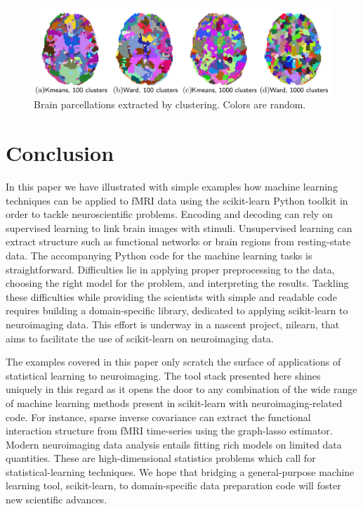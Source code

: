 \documentclass{frontiersSCNS} %
\begin{document}
\begin{figure}[hbtp]
  \includegraphics[width=\linewidth]{clustering}
  \caption{Brain parcellations extracted by clustering. Colors are
random.}
  \label{fig:clustering}
\end{figure}

\section{Conclusion}

In this paper we have illustrated with simple examples how machine
learning techniques can be applied
to fMRI data using the scikit-learn Python toolkit in order to tackle
neuroscientific problems. Encoding and decoding can rely on supervised
learning to link brain images with stimuli. Unsupervised learning
can extract structure such as functional networks or
brain regions from resting-state data. The accompanying Python code for the machine learning
tasks is straightforward. Difficulties lie in applying proper 
preprocessing to the data, choosing the right model for the problem,
and interpreting the results. Tackling these difficulties while
providing the scientists with simple and readable code requires building
a domain-specific library, dedicated to applying scikit-learn to
neuroimaging data. This effort is underway in a nascent project, nilearn,
that aims to facilitate the use of scikit-learn on neuroimaging data.

The examples covered in this paper only scratch the
surface of applications of statistical learning to neuroimaging.
The tool stack presented here shines uniquely in this regard as it opens the
door to any combination of the wide range of machine learning methods
present in scikit-learn with neuroimaging-related code. For
instance, sparse inverse covariance can extract the functional 
interaction structure from fMRI time-series \citep{varoquaux2013} using
the graph-lasso estimator.
Modern neuroimaging data analysis entails fitting rich models on
limited data quantities. These are high-dimensional statistics problems
which call
for statistical-learning techniques. We hope that bridging a
general-purpose machine learning tool, scikit-learn, to domain-specific
data preparation code will foster new scientific advances.
\end{document}
